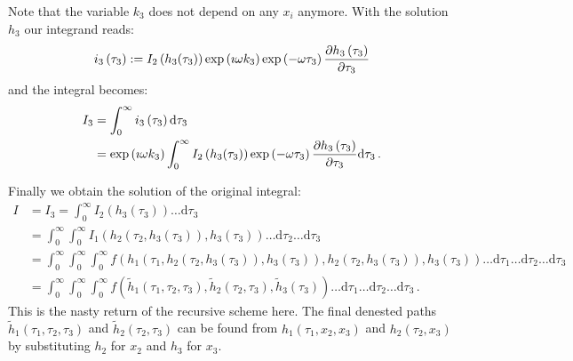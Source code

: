 \documentclass[a4paper,10pt]{article}
\begin{document}
Note that the variable $k_3$ does not depend on any $x_i$ anymore.
With the solution $h_3$ our integrand reads:
\begin{equation}
 i_3\left(\tau_3\right) := I_2\left(h_3(\tau_3)\right) \exp\left(\imath \omega k_3 \right)
                           \exp\left(- \omega \tau_3 \right) \frac{\partial h_3\left(\tau_3\right)}{\partial \tau_3}
\end{equation}
and the integral becomes:
\begin{equation}
\begin{split}
  I_3 & = \int_0^{\infty} i_3\left(\tau_3\right) \mathrm{d}\tau_3 \\
      & = \exp\left(\imath \omega k_3\right)
          \int_0^{\infty} I_2\left(h_3(\tau_3)\right)
                          \exp\left(- \omega \tau_3 \right)
                          \frac{\partial h_3\left(\tau_3\right)}{\partial \tau_3}
          \mathrm{d}\tau_3 \,.
\end{split}
\end{equation}

Finally we obtain the solution of the original integral:
\begin{equation*}
\begin{split}
  I & = I_3 = \int_0^{\infty} I_2\left(h_3(\tau_3)\right) \ldots \mathrm{d}\tau_3 \\
    & = \int_0^{\infty}
          \int_0^{\infty} I_1\left(h_2(\tau_2, h_3(\tau_3)), h_3(\tau_3)\right)
          \ldots \mathrm{d}\tau_2
        \ldots \mathrm{d}\tau_3 \\
    & = \int_0^{\infty}
          \int_0^{\infty}
            \int_0^{\infty} f\left(h_1(\tau_1, h_2(\tau_2, h_3(\tau_3)), h_3(\tau_3)),
                                   h_2(\tau_2, h_3(\tau_3)),
                                   h_3(\tau_3)
                             \right)
            \ldots \mathrm{d}\tau_1
          \ldots \mathrm{d}\tau_2
        \ldots \mathrm{d}\tau_3 \\
    & = \int_0^{\infty}
          \int_0^{\infty}
            \int_0^{\infty} f\left(\tilde{h}_1(\tau_1, \tau_2, \tau_3),
                                   \tilde{h}_2(\tau_2, \tau_3),
                                   \tilde{h}_3(\tau_3)
                             \right)
            \ldots \mathrm{d}\tau_1
          \ldots \mathrm{d}\tau_2
        \ldots \mathrm{d}\tau_3 \,.
\end{split}
\end{equation*}
This is the nasty return of the recursive scheme here.
The final denested paths $\tilde{h}_1\left(\tau_1, \tau_2, \tau_3\right)$ and
$\tilde{h}_2\left(\tau_2, \tau_3\right)$ can be found from
$h_1\left(\tau_1, x_2, x_3\right)$ and $h_2\left(\tau_2, x_3\right)$
by substituting $h_2$ for $x_2$ and $h_3$ for $x_3$.
\end{document}
